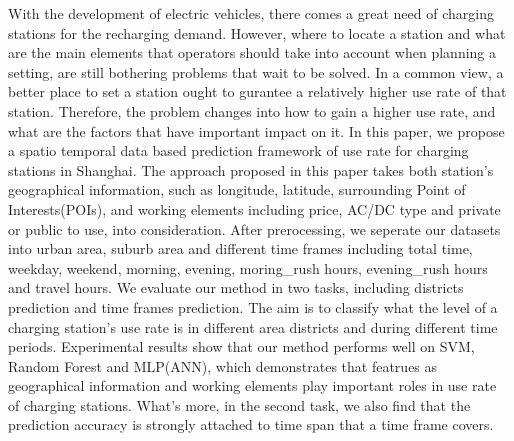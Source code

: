 With the development of electric vehicles, there comes a great need of charging stations for the recharging demand. However, where to locate a station and what are the main elements that operators should take into account when planning a setting, are still bothering problems that wait to be solved. In a common view, a better place to set a station ought to gurantee a relatively higher use rate of that station. Therefore, the problem changes into how to gain a higher use rate, and what are the factors that have important impact on it. In this paper, we propose a spatio temporal data based prediction framework of use rate for charging stations in Shanghai. The approach proposed in this paper takes both station's geographical information, such as longitude, latitude, surrounding Point of Interests(POIs), and working elements including price, AC/DC type and private or public to use, into consideration. After prerocessing, we seperate our datasets into urban area, suburb area and different time frames including total time, weekday, weekend, morning, evening, moring\_rush hours, evening\_rush hours and travel hours. We evaluate our method in two tasks, including districts prediction and time frames prediction. The aim is to classify what the level of a charging station's use rate is in different area districts and during different time periods. Experimental results show that our method performs well on SVM, Random Forest and MLP(ANN), which demonstrates that featrues as geographical information and working elements play important roles in use rate of charging stations. What's more, in the second task, we also find that the prediction accuracy is strongly attached to time span that a time frame covers.
